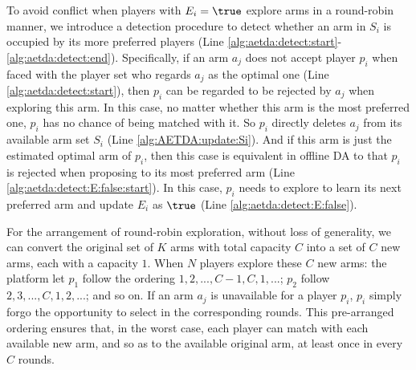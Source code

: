 To avoid conflict when players with $E_i=\true$ explore arms in a round-robin manner, we introduce a detection procedure to detect whether an arm in $S_i$ is occupied by its more preferred players (Line \ref{alg:aetda:detect:start}-\ref{alg:aetda:detect:end}).   
Specifically, if an arm $a_j$ does not accept player $p_i$ when faced with the player set who regards $a_j$ as the optimal one (Line \ref{alg:aetda:detect:start}), then $p_i$ can be regarded to be rejected by $a_j$ when exploring this arm. 
In this case, no matter whether this arm is the most preferred one, $p_i$ has no chance of being matched with it. 
So $p_i$ directly deletes $a_j$ from its available arm set $S_i$ (Line \ref{alg:AETDA:update:Si}). And if this arm is just the estimated optimal arm of $p_i$, then this case is equivalent in offline DA to that $p_i$ is rejected when proposing to its most preferred arm (Line \ref{alg:aetda:detect:E:false:start}). 
In this case, $p_i$ needs to explore to learn its next preferred arm and update $E_i$ as $\true$ (Line \ref{alg:aetda:detect:E:false}). 


For the arrangement of round-robin exploration, without loss of generality, we can convert the original set of $K$ arms with total capacity $C$ into a set of $C$ new arms, each with a capacity $1$. When $N$ players explore these $C$ new arms: the platform let $p_1$ follow the ordering $1,2,...,C-1,C,1,...$; $p_2$ follow $2,3,...,C,1,2,...$; and so on.
If an arm $a_j$ is unavailable for a player $p_i$, $p_i$ simply forgo the opportunity to select in the corresponding rounds. This pre-arranged ordering ensures that, in the worst case, each player can match with each available new arm, and so as to the available original arm, at least once in every $C$ rounds.




